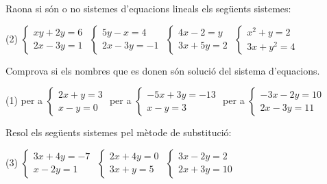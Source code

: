 \begin{mylist}
\exer \mental Raona si són o no sistemes d'equacions lineals els següents sistemes:
\begin{tasks}(2)
	\task  $\left\{\begin{array}{c} {xy+2y=6} \\ {2x-3y=1} \end{array}\right. $   
	\task  $\left\{\begin{array}{c} {5y-x=4} \\ {2x-3y=-1} \end{array}\right. $   
	\task  $\left\{\begin{array}{c} {4x-2=y} \\ {3x+5y=2} \end{array}\right. $   
	\task  $\left\{\begin{array}{c} {x^{2} +y=2} \\ {3x+y^{2} =4} \end{array}\right. $
\end{tasks}

\exer Comprova si els nombres que es donen són solució del sistema d'equacions.
\begin{tasks}(1)
	\task {}      per a $\left\{\begin{array}{c} {2x+y=3} \\ {x-y=0} \end{array}\right. $   
	\task  {}     per a $\left\{\begin{array}{c} {-5x+3y=-13} \\ {x-y=3} \end{array}\right. $   
	\task   {}     per a $\left\{\begin{array}{c} {-3x-2y=10} \\ {2x-3y=11} \end{array}\right. $  
\end{tasks}
\answers{[No--Sí, Sí--No, No--No]}

\exer  Resol els següents sistemes pel mètode de substitució:

\begin{tasks}(3)
	\task  $\left\{\begin{array}{c} {3x+4y=-7} \\ {x-2y=1} \end{array}\right. $   
	\task  $\left\{\begin{array}{c} {2x+4y=0} \\ {3x+y=5} \end{array}\right. $  
	\task  $\left\{\begin{array}{c} {3x-2y=2} \\ {2x+3y=10} \end{array}\right. $
\end{tasks}
\answers{[$(-1,-1)$, $(2,-1)$, $(2,2)$]}



\end{mylist}

